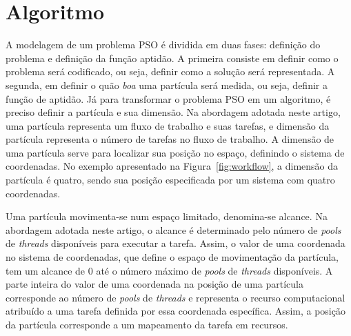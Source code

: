 \documentclass[sigconf]{acmart}
\begin{document}
\section{Algoritmo}
\label{sec:algoritmo}
A modelagem de um problema PSO é dividida em duas fases: definição do problema e definição da função aptidão. A primeira consiste em definir como o problema será codificado, ou seja, definir como a solução será representada. A segunda, em definir o quão \textit{boa} uma partícula será medida, ou seja, definir a função de aptidão.
Já para transformar o problema PSO em um algoritmo, é preciso definir a partícula e sua dimensão. Na abordagem adotada neste artigo, uma partícula representa um fluxo de trabalho e suas tarefas, e dimensão da partícula representa o número de tarefas no fluxo de trabalho. A dimensão de uma partícula serve para localizar sua posição no espaço, definindo o sistema de coordenadas. No exemplo apresentado na Figura~\ref{fig:workflow}, a dimensão da partícula é quatro, sendo sua posição especificada por um sistema com quatro coordenadas.

Uma partícula movimenta-se num espaço limitado, denomina-se alcance. Na abordagem adotada neste artigo, o alcance é determinado pelo número de \emph{pools} de \emph{threads} disponíveis para executar a tarefa. Assim, o valor de uma coordenada no sistema de coordenadas, que define o espaço de movimentação da partícula, tem um alcance de 0 até o número máximo de \emph{pools} de \emph{threads} disponíveis. A parte inteira do valor de uma coordenada na posição de uma partícula corresponde ao número de \emph{pools} de \emph{threads} e representa o recurso computacional atribuído a uma tarefa definida por essa coordenada específica. Assim, a posição da partícula corresponde a um mapeamento da tarefa em recursos. 
\end{document}
